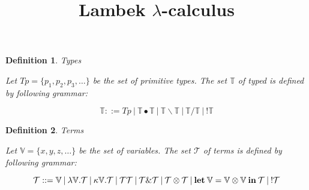 \documentclass[a4paper]{article}
\date{}
\title{Lambek $\lambda$-calculus}
\newtheorem{defin}{Definition}
\begin{document}
\begin{defin} Types

  Let $Tp = \{ p_1, p_2, p_3, \dots \}$ be the set of primitive types. The set $\mathbb{T}$ of typed is defined by following grammar:

\begin{equation}
  \mathbb{T} ::= Tp \: | \: \mathbb{T} \bullet \mathbb{T} \: | \: \mathbb{T} \backslash \mathbb{T} \: | \: \mathbb{T} / \mathbb{T} \: | \: ! \mathbb{T}
\end{equation}
\end{defin}

\begin{defin} Terms

  Let $\mathbb{V} = \{ x, y, z, \dots \}$ be the set of variables. The set $\mathcal{T}$ of terms is defined by following grammar:

\begin{equation}
  \mathcal{T} ::= \mathbb{V} \: | \: \lambda \mathbb{V}. \mathcal{T} \: | \: \kappa \mathbb{V}. \mathcal{T} \: | \: \mathcal{T} \mathcal{T} \: | \: \mathcal{T} \& \mathcal{T} \: | \: \mathcal{T} \otimes \mathcal{T} \: | \:
  {\bf let \:} \mathbb{V} = \mathbb{V} \otimes \mathbb{V} {\: \bf in \:} \mathcal{T} \: | \: ! \mathcal{T}
\end{equation}
\end{defin}
\end{document}
